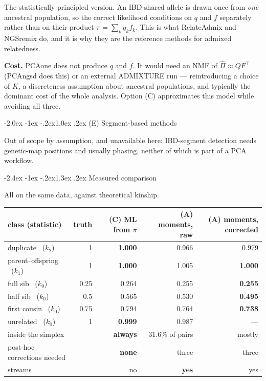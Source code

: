 \documentclass[10pt,a4paper]{article}
\makeatletter
\renewcommand\section{\@startsection{section}{1}{\z@}%
  {-2.4ex \@plus -1ex \@minus -.2ex}{1.3ex \@plus.2ex}%
  {\normalfont\large\bfseries\color{hdr}}}
\renewcommand\subsection{\@startsection{subsection}{2}{\z@}%
  {-2.0ex \@plus -1ex \@minus -.2ex}{1.0ex \@plus.2ex}%
  {\normalfont\normalsize\bfseries\color{hdr}}}
\makeatother
\begin{document}
The statistically principled version. An IBD-shared allele is drawn once from \emph{one} ancestral
population, so the correct likelihood conditions on $q$ and $f$ separately rather than on their product
$\pi=\sum_k q_kf_k$. This is what RelateAdmix and NGSremix do, and it is why they are the reference methods
for admixed relatedness.

\textbf{Cost.} PCAone does not produce $q$ and $f$. It would need an NMF of $\hat\Pi\approx QF^{\!\top}$
(PCAngsd does this) or an external ADMIXTURE run --- reintroducing a choice of $K$, a discreteness
assumption about ancestral populations, and typically the dominant cost of the whole analysis. Option (C)
approximates this model while avoiding all three.

\subsection{(E) Segment-based methods}

Out of scope by assumption, and unavailable here: IBD-segment detection needs genetic-map positions and
usually phasing, neither of which is part of a PCA workflow.

\section{Measured comparison}

All on the same data, against theoretical kinship.

\begin{center}
\small
\begin{tabular}{@{}lrrrr@{}}
\toprule
\textbf{class (statistic)} & \textbf{truth} & \textbf{(C) ML from $\pi$} & \textbf{(A) moments, raw} & \textbf{(A) moments, corrected} \\
\midrule
duplicate \ ($k_2$)        & 1    & \textbf{1.000} & 0.966 & 0.979 \\
parent--offspring \ ($k_1$)& 1    & \textbf{1.000} & 1.005 & \textbf{1.000} \\
full sib \ ($k_0$)         & 0.25 & 0.264 & 0.255 & \textbf{0.255} \\
half sib \ ($k_0$)         & 0.5  & 0.565 & 0.530 & \textbf{0.495} \\
first cousin \ ($k_0$)     & 0.75 & 0.794 & 0.764 & \textbf{0.738} \\
unrelated \ ($k_0$)        & 1    & \textbf{0.999} & 0.987 & --- \\
\midrule
inside the simplex          &      & \textbf{always} & 31.6\% of pairs & mostly \\
post-hoc corrections needed &      & \textbf{none}   & three & three \\
streams                     &      & no & \textbf{yes} & yes \\
\bottomrule
\end{tabular}
\end{center}
\end{document}
